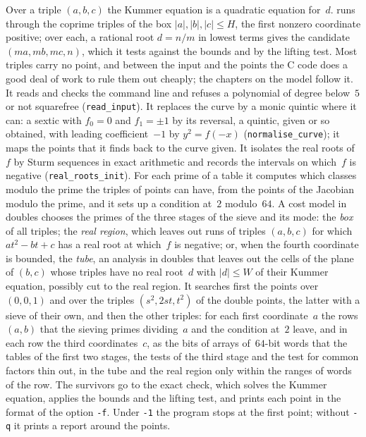 Over a triple $(a, b, c)$ the Kummer equation is a quadratic equation for~$d$. \jpoints{} runs
through the coprime triples of the box $|a|, |b|, |c| \le H$, the first nonzero coordinate positive;
over each, a rational root $d = n/m$ in lowest terms gives the candidate $(m a, m b, m c, n)$, which
it tests against the bounds and by the lifting test. Most triples carry no point, and between the
input and the points the C code does a good deal of work to rule them out cheaply; the chapters on
the model follow it. It reads and checks the command line and refuses a polynomial of degree
below~$5$ or not squarefree (\texttt{read\_input}). It replaces the curve by a monic quintic where
it can: a sextic with $f_0 = 0$ and $f_1 = \pm 1$ by its reversal, a quintic, given or so obtained,
with leading coefficient~$-1$ by $y^2 = f(-x)$ (\texttt{normalise\_curve}); it maps the points that
it finds back to the curve given. It isolates the real roots of~$f$ by Sturm sequences in exact
arithmetic and records the intervals on which~$f$ is negative (\texttt{real\_roots\_init}). For each
prime of a table it computes which classes modulo the prime the triples of points can have, from the
points of the Jacobian modulo the prime, and it sets up a condition at~$2$ modulo~$64$. A
cost model in doubles chooses the primes of the three stages of the sieve and its mode: the
\emph{box} of all triples; the \emph{real region}, which leaves out runs of triples $(a, b, c)$ for
which $a t^2 - b t + c$ has a real root at which~$f$ is negative; or, when the fourth coordinate is
bounded, the \emph{tube}, an analysis in doubles that leaves out the cells of the plane of $(b, c)$
whose triples have no real root~$d$ with $|d| \le W$ of their Kummer equation, possibly cut to the
real region. It searches first the points over $(0, 0, 1)$ and over the triples $(s^2, 2st, t^2)$ of
the double points, the latter with a sieve of their own, and then the other triples: for each first
coordinate~$a$ the rows $(a, b)$ that the sieving primes dividing~$a$ and the condition at~$2$
leave, and in each row the third coordinates~$c$, as the bits of arrays of~$64$-bit words that the
tables of the first two stages, the tests of the third stage and the test for common factors thin
out, in the tube and the real region only within the ranges of words of the row. The survivors go to
the exact check, which solves the Kummer equation, applies the bounds and the lifting test, and
prints each point in the format of the option \verb|-f|. Under \verb|-1| the program stops at the
first point; without \verb|-q| it prints a report around the points.

